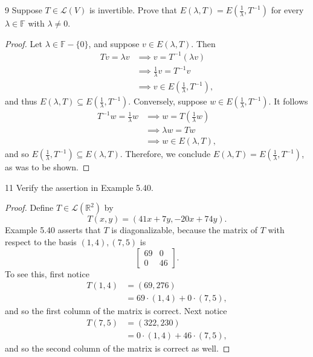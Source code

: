 \documentclass{extarticle}
\newenvironment{problem}[1]{\begin{prob*}{#1}{}}{\end{prob*}}
\newcommand{\R}{\mathbb{R}}
\newcommand{\F}{\mathbb{F}}
\newcommand{\Hom}{\mathcal{L}}
\begin{document}
\begin{problem}{9}
Suppose $T\in\Hom(V)$ is invertible.  Prove that $E(\lambda, T) = E\left(\frac{1}{\lambda}, T^{-1}\right)$ for every $\lambda\in\F$ with $\lambda\neq 0$.  
\end{problem}
\begin{proof}
Let $\lambda\in\F-\{0\}$, and suppose $v\in E(\lambda, T)$.  Then
\begin{align*}
Tv = \lambda v  &\implies v = T^{-1}(\lambda v)\\
&\implies \frac{1}{\lambda}v = T^{-1}v\\
&\implies v \in E\left(\frac{1}{\lambda}, T^{-1}\right),
\end{align*}
and thus $E(\lambda, T)\subseteq E\left(\frac{1}{\lambda}, T^{-1}\right)$.  Conversely, suppose $w\in E\left(\frac{1}{\lambda}, T^{-1}\right)$.  It follows
\begin{align*}
T^{-1}w = \frac{1}{\lambda}w &\implies w = T\left(\frac{1}{\lambda} w\right)\\
&\implies \lambda w = Tw\\
&\implies w\in E(\lambda, T),
\end{align*}
and so $E\left(\frac{1}{\lambda}, T^{-1}\right)\subseteq E(\lambda, T)$.  Therefore, we conclude $E(\lambda, T) = E\left(\frac{1}{\lambda}, T^{-1}\right)$, as was to be shown.
\end{proof}

\begin{problem}{11}
Verify the assertion in Example 5.40.
\end{problem}
\begin{proof}
Define $T\in\Hom(\R^2)$ by
\begin{equation*}
T(x, y) = (41x + 7y, -20x + 74y).
\end{equation*}
Example 5.40 asserts that $T$ is diagonalizable, because the matrix of $T$ with respect to the basis $(1, 4), (7, 5)$ is
\begin{equation*}
\begin{bmatrix}69 & 0\\ 0 & 46\end{bmatrix}.
\end{equation*}
To see this, first notice
\begin{align*}
T(1, 4) &= (69, 276) \\
&= 69\cdot (1, 4) + 0\cdot (7, 5),
\end{align*}
and so the first column of the matrix is correct.  Next notice
\begin{align*}
T(7, 5) &= (322, 230)\\
&= 0\cdot (1, 4) + 46 \cdot (7, 5),
\end{align*}
and so the second column of the matrix is correct as well. 
\end{proof}
\end{document}
